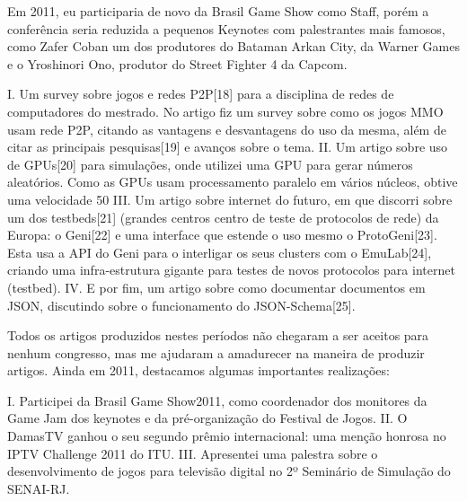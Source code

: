 \documentclass[10pt,a4paper,oneside]{book}
\begin{document}
Em 2011, eu participaria de novo da Brasil Game Show como Staff, porém a conferência seria reduzida 
a pequenos Keynotes com palestrantes mais famosos, como  Zafer Coban um dos produtores do Bataman 
Arkan City, da Warner Games e o Yroshinori Ono, produtor do Street Fighter 4 da Capcom.

I.  Um survey sobre jogos e redes P2P[18] para a disciplina de redes de computadores do mestrado. No artigo fiz um survey sobre como os jogos MMO usam rede P2P, citando as vantagens e desvantagens do uso da mesma, além de citar as principais pesquisas[19] e avanços sobre o tema.
II. Um artigo sobre uso de GPUs[20] para simulações, onde utilizei uma GPU para gerar números aleatórios. Como as GPUs usam processamento paralelo em vários núcleos, obtive uma velocidade 50%
III. Um artigo sobre internet do futuro, em que discorri sobre um dos testbeds[21] (grandes centros centro de teste de protocolos de rede) da Europa: o Geni[22] e uma interface que estende o uso mesmo o ProtoGeni[23]. Esta usa a API do Geni para o interligar os seus clusters com o EmuLab[24],  criando uma infra-estrutura gigante para testes de novos protocolos para internet (testbed).
IV. E por fim, um artigo sobre como documentar documentos em JSON, discutindo sobre o funcionamento do JSON-Schema[25].

Todos os artigos produzidos nestes períodos não chegaram a ser aceitos para nenhum congresso, mas me ajudaram a amadurecer na maneira de produzir artigos. Ainda em 2011, destacamos algumas importantes realizações:

I. Participei da Brasil Game Show2011, como coordenador dos monitores da Game Jam dos keynotes e da pré-organização do Festival de Jogos.
II. O DamasTV ganhou o seu segundo prêmio internacional: uma menção honrosa no IPTV Challenge 2011 do ITU.
III. Apresentei uma palestra sobre o desenvolvimento de jogos para televisão digital no 2º Seminário de Simulação do SENAI-RJ.
\end{document}
